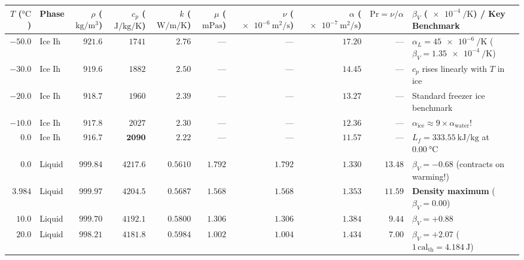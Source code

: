 \begin{center}
\label{tab:04:waterice1atm}
\scriptsize\setlength{\tabcolsep}{3.2pt}\renewcommand{\arraystretch}{1.08}
\begin{tabularx}{\linewidth}{@{}r l r r r r r r r X@{}}\toprule
\textbf{$T$ ($\si{\celsius}$)} & \textbf{Phase} & \textbf{$\rho$ ($\si{\kilogram\per\cubic\meter}$)} & \textbf{$c_p$ ($\si{\joule\per\kilogram\per\kelvin}$)} & \textbf{$k$ ($\si{\watt\per\meter\per\kelvin}$)} & \textbf{$\mu$ ($\si{\milli\pascal\second}$)} & \textbf{$\nu$ ($\SI{e-6}{\square\meter\per\second}$)} & \textbf{$\alpha$ ($\SI{e-7}{\square\meter\per\second}$)} & \textbf{$\mathrm{Pr} = \nu/\alpha$} & \textbf{$\beta_V$ ($\SI{e-4}{\per\kelvin}$) / Key Benchmark} \\\midrule
$-50.0$ & Ice Ih & $921.6$ & $1741$ & $2.76$ & --- & --- & $17.20$ & --- & $\alpha_L = \SI{45e-6}{\per\kelvin}$ ($\beta_V = \SI{1.35e-4}{\per\kelvin}$) \\
$-30.0$ & Ice Ih & $919.6$ & $1882$ & $2.50$ & --- & --- & $14.45$ & --- & $c_p$ rises linearly with $T$ in ice \\
$-20.0$ & Ice Ih & $918.7$ & $1960$ & $2.39$ & --- & --- & $13.27$ & --- & Standard freezer ice benchmark \\
$-10.0$ & Ice Ih & $917.8$ & $2027$ & $2.30$ & --- & --- & $12.36$ & --- & $\alpha_{\mathrm{ice}} \approx 9\times \alpha_{\mathrm{water}}$! \\
$0.0$ & Ice Ih & $916.7$ & $\mathbf{2090}$ & $2.22$ & --- & --- & $11.57$ & --- & $L_f = \SI{333.55}{\kilo\joule\per\kilogram}$ at $\SI{0.00}{\celsius}$ \\\midrule
$0.0$ & Liquid & $999.84$ & $4217.6$ & $0.5610$ & $1.792$ & $1.792$ & $1.330$ & $13.48$ & $\beta_V = \mathbf{-0.68}$ (contracts on warming!) \\
$3.984$ & Liquid & $\mathbf{999.97}$ & $4204.5$ & $0.5687$ & $1.568$ & $1.568$ & $1.353$ & $11.59$ & \textbf{Density maximum} ($\beta_V = 0.00$) \\
$10.0$ & Liquid & $999.70$ & $4192.1$ & $0.5800$ & $1.306$ & $1.306$ & $1.384$ & $9.44$ & $\beta_V = +0.88$ \\
$20.0$ & Liquid & $998.21$ & $\mathbf{4181.8}$ & $0.5984$ & $1.002$ & $1.004$ & $1.434$ & $7.00$ & $\beta_V = +2.07$ ($1\,\mathrm{cal}_{\mathrm{th}} = \SI{4.184}{\joule}$) \\

\end{tabularx}
\end{center}
